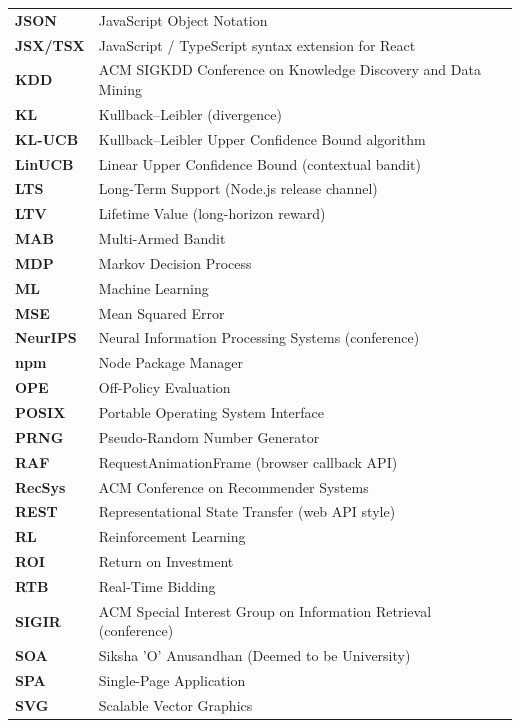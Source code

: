 \begin{xltabular}{\linewidth}{@{}p{3.5cm} X@{}}
\textbf{JSON}       & JavaScript Object Notation\\
\textbf{JSX/TSX}    & JavaScript / TypeScript syntax extension for React\\
\textbf{KDD}        & ACM SIGKDD Conference on Knowledge Discovery and Data Mining\\
\textbf{KL}         & Kullback--Leibler (divergence)\\
\textbf{KL-UCB}     & Kullback--Leibler Upper Confidence Bound algorithm\\
\textbf{LinUCB}     & Linear Upper Confidence Bound (contextual bandit)\\
\textbf{LTS}        & Long-Term Support (Node.js release channel)\\
\textbf{LTV}        & Lifetime Value (long-horizon reward)\\
\textbf{MAB}        & Multi-Armed Bandit\\
\textbf{MDP}        & Markov Decision Process\\
\textbf{ML}         & Machine Learning\\
\textbf{MSE}        & Mean Squared Error\\
\textbf{NeurIPS}    & Neural Information Processing Systems (conference)\\
\textbf{npm}        & Node Package Manager\\
\textbf{OPE}        & Off-Policy Evaluation\\
\textbf{POSIX}      & Portable Operating System Interface\\
\textbf{PRNG}       & Pseudo-Random Number Generator\\
\textbf{RAF}        & RequestAnimationFrame (browser callback API)\\
\textbf{RecSys}     & ACM Conference on Recommender Systems\\
\textbf{REST}       & Representational State Transfer (web API style)\\
\textbf{RL}         & Reinforcement Learning\\
\textbf{ROI}        & Return on Investment\\
\textbf{RTB}        & Real-Time Bidding\\
\textbf{SIGIR}      & ACM Special Interest Group on Information Retrieval (conference)\\
\textbf{SOA}        & Siksha 'O' Anusandhan (Deemed to be University)\\
\textbf{SPA}        & Single-Page Application\\
\textbf{SVG}        & Scalable Vector Graphics\\

\end{xltabular}
